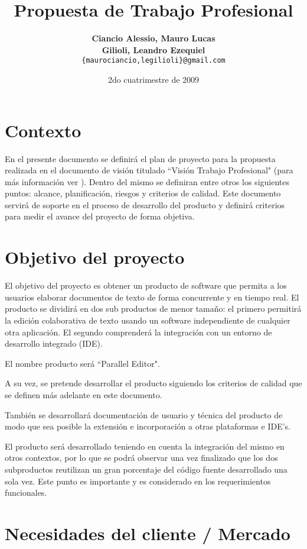 \documentclass[12pt,a4paper]{article}
\title { \textbf{Propuesta de Trabajo Profesional}}
\date{2do cuatrimestre de 2009}
\author{\textbf{Ciancio Alessio, Mauro Lucas} \\
		\textbf{Gilioli, Leandro Ezequiel}	  \\
		\texttt{\{maurociancio,legilioli\}@gmail.com}
	}
\begin{document}
\maketitle
\tableofcontents
\newpage

	\section{Contexto}

	En el presente documento se definirá el plan de proyecto para la propuesta realizada en el documento de visión titulado ``Visión Trabajo Profesional" (para más información ver \cite{visiontpprof}). 
	Dentro del mismo se definiran entre otros los siguientes puntos: alcance, planificación, riesgos y criterios de calidad. 
	Este documento servirá de soporte en el proceso de desarrollo del producto y definirá criterios para medir el avance del proyecto de forma objetiva.	
		
	\section{Objetivo del proyecto}

El objetivo del proyecto es obtener un producto de software que permita a los usuarios elaborar documentos de texto de forma concurrente y en tiempo real. El producto se dividirá en dos sub productos de menor tamaño: el primero permitirá la edición colaborativa de texto usando un software independiente de cualquier otra aplicación. El segundo comprenderá la integración con un entorno de desarrollo integrado (IDE).

El nombre producto será ``Parallel Editor".

A su vez, se pretende desarrollar el producto siguiendo los criterios de calidad que se definen más adelante en este documento.

También se desarrollará documentación de usuario y técnica del producto de modo que sea posible la extensión e incorporación a otras plataformas e IDE's.

El producto será desarrollado teniendo en cuenta la integración del mismo en otros contextos, por lo que se podrá observar una vez finalizado que los dos subproductos reutilizan un gran porcentaje del código fuente desarrollado una sola vez. Este punto es importante y es considerado en los requerimientos funcionales.	
	
	\section{Necesidades del cliente / Mercado}
	
\end{document}
